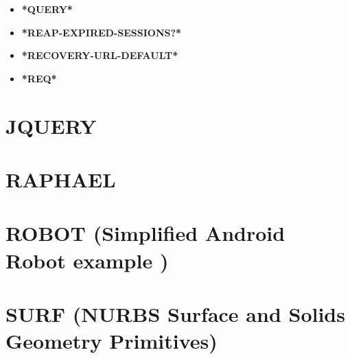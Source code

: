 \documentclass [11pt]{book}
\begin{document}
\begin{itemize}
\item {}
\label{prim:*query*}
\textbf{*QUERY*}





\item {}
\label{prim:*reap-expired-sessions?*}
\textbf{*REAP-EXPIRED-SESSIONS?*}





\item {}
\label{prim:*recovery-url-default*}
\textbf{*RECOVERY-URL-DEFAULT*}





\item {}
\label{prim:*req*}
\textbf{*REQ*}





\end{itemize}





\section{JQUERY }

\label{sec:jquery}







\section{RAPHAEL }

\label{sec:raphael}







\section{ROBOT (Simplified Android Robot example )}

\label{sec:robot(simplifiedandroidrobotexample)}







\section{SURF (NURBS Surface and Solids Geometry Primitives)}
\end{document}
